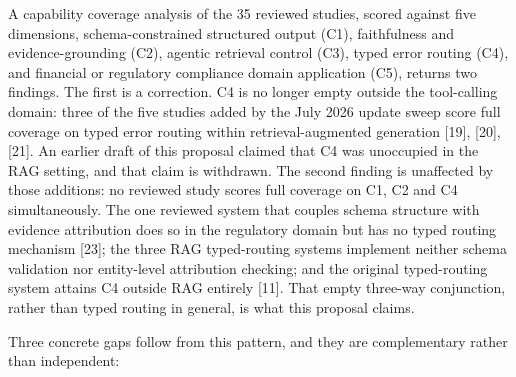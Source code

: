 \documentclass[11pt,a4paper]{article}
\begin{document}
A capability coverage analysis of the 35 reviewed studies, scored against five
dimensions, schema-constrained structured output (C1), faithfulness and
evidence-grounding (C2), agentic retrieval control (C3), typed error routing (C4), and
financial or regulatory compliance domain application (C5), returns two findings. The
first is a correction. C4 is no longer empty outside the tool-calling domain: three of
the five studies added by the July 2026 update sweep score full coverage on typed error
routing within retrieval-augmented generation [19], [20], [21]. An earlier draft of this
proposal claimed that C4 was unoccupied in the RAG setting, and that claim is withdrawn.
The second finding is unaffected by those additions: no reviewed study scores full
coverage on C1, C2 and C4 simultaneously. The one reviewed system that couples schema
structure with evidence attribution does so in the regulatory domain but has no typed
routing mechanism [23]; the three RAG typed-routing systems implement neither schema
validation nor entity-level attribution checking; and the original typed-routing system
attains C4 outside RAG entirely [11]. That empty three-way conjunction, rather than typed
routing in general, is what this proposal claims.

Three concrete gaps follow from this pattern, and they are complementary rather than
independent:
\end{document}
